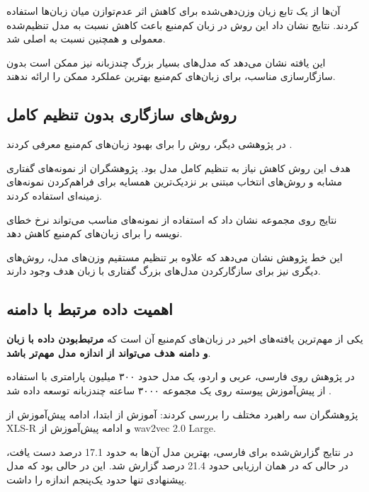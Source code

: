 آن‌ها از یک تابع زیان وزن‌دهی‌شده برای کاهش اثر عدم‌توازن میان
زبان‌ها استفاده کردند.
نتایج نشان داد این روش در زبان کم‌منبع باعث کاهش
نسبت به مدل تنظیم‌شده معمولی و همچنین نسبت به  اصلی شد.

این یافته نشان می‌دهد که مدل‌های بسیار بزرگ چندزبانه نیز ممکن
است بدون سازگار‌سازی مناسب، برای زبان‌های کم‌منبع بهترین
عملکرد ممکن را ارائه ندهند.


\subsection{روش‌های سازگاری  بدون تنظیم کامل}

در پژوهشی دیگر،
روش
را برای بهبود  زبان‌های کم‌منبع معرفی کردند
\cite{hsu2024metawhisper}.

هدف این روش کاهش نیاز به تنظیم کامل مدل بود.
پژوهشگران از نمونه‌های گفتاری مشابه و روش‌های انتخاب مبتنی بر
نزدیک‌ترین همسایه برای فراهم‌کردن نمونه‌های زمینه‌ای استفاده
کردند.

نتایج روی مجموعه
نشان داد که استفاده از نمونه‌های مناسب می‌تواند نرخ خطای نویسه
را برای زبان‌های کم‌منبع کاهش دهد.

این خط پژوهش نشان می‌دهد که علاوه بر تنظیم مستقیم وزن‌های مدل،
روش‌های دیگری نیز برای سازگارکردن مدل‌های بزرگ گفتاری با زبان
هدف وجود دارند.


\subsection{اهمیت داده مرتبط با دامنه}

یکی از مهم‌ترین یافته‌های اخیر در  زبان‌های کم‌منبع آن است
که
\textbf{مرتبط‌بودن داده با زبان و دامنه هدف می‌تواند از اندازه
مدل مهم‌تر باشد}.

در پژوهش
روی فارسی، عربی و اردو، یک مدل حدود ۳۰۰ میلیون پارامتری با
استفاده از پیش‌آموزش پیوسته روی یک مجموعه ۳۰۰۰ ساعته چندزبانه
توسعه داده شد
\cite{bandarupalli2025efficient}.

پژوهشگران سه راهبرد مختلف را بررسی کردند:
آموزش از ابتدا، ادامه پیش‌آموزش از XLS-R و ادامه پیش‌آموزش
از wav2vec 2.0 Large.

در نتایج گزارش‌شده برای فارسی، بهترین مدل آن‌ها به
حدود 17.1 درصد دست یافت، در حالی که  در همان
ارزیابی حدود 21.4 درصد گزارش شد.
این در حالی بود که مدل پیشنهادی تنها حدود یک‌پنجم اندازه
 را داشت.

